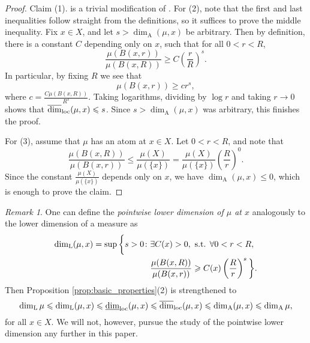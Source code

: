 \documentclass{PRM}
\newcommand{\updim}{\overline{\dim}}
\newcommand{\lowdim}{\underline{\dim}}
\newcommand{\adim}{\dim_{\mathrm{A}}}
\theoremstyle{plain}
\theoremstyle{definition}
\theoremstyle{remark}
\newtheorem{huom}[thm]{Remark}
\begin{document}
\begin{proof}
    Claim (1). is a trivial modification of \cite[Lemma 4.1.1]{F}. For (2), note that the first and last inequalities follow straight from the definitions, so it suffices to prove the middle inequality. Fix $x\in X$, and let $s> \dim_{\mathrm{A}}(\mu,x)$ be arbitrary. Then by definition, there is a constant $C$ depending only on $x$, such that for all $0<r<R$,
    \begin{equation*}
        \frac{\mu(B(x,r))}{\mu(B(x,R))}\geq C\left(\frac{r}{R}\right)^s.
    \end{equation*}
    In particular, by fixing $R$ we see that
    \begin{equation*}
        \mu(B(x,r))\geq c r^s,
    \end{equation*}
    where $c=\frac{C\mu(B(x,R))}{R^s}$. Taking logarithms, dividing by $\log r$ and taking $r\to 0$ shows that $\updim_{\textnormal{loc}}(\mu,x)\leq s$. Since $s>\dim_{\mathrm{A}}(\mu,x)$ was arbitrary, this finishes the proof.

    For (3), assume that $\mu$ has an atom at $x\in X$. Let $0<r<R$, and note that
    \begin{equation*}
        \frac{\mu(B(x,R))}{\mu(B(x,r))}\leq \frac{\mu(X)}{\mu(\{x\})}=\frac{\mu(X)}{\mu(\{x\})}\left(\frac{R}{r}\right)^0.
    \end{equation*}
    Since the constant $\frac{\mu(X)}{\mu(\{x\})}$ depends only on $x$, we have $\dim_{\mathrm{A}}(\mu,x)\leq 0$, which is enough to prove the claim.
\end{proof}

\begin{huom}
One can define the \emph{pointwise lower dimension of $\mu$ at $x$} analogously to the lower dimension of a measure as
\begin{align*}
    \dim_{\mathrm{L}}(\mu,x)=\sup\bigg\{s>0\colon &\exists C(x)>0,\textnormal{ s.t. }\forall0<r<R,\\
    &\frac{\mu(B(x,R))}{\mu(B(x,r))}\geq C(x)\left(\frac{R}{r}\right)^s\bigg\}.
\end{align*}
Then Proposition \ref{prop:basic_properties}(2) is strengthened to 
\begin{equation*}
    \dim_{\mathrm{L}}\mu\leq\dim_{\mathrm{L}}(\mu,x)\leq\lowdim_{\textnormal{loc}}(\mu,x)\leq\updim_{\textnormal{loc}}(\mu,x)\leq \dim_{\mathrm{A}}(\mu,x)\leq\adim\mu,
\end{equation*}
for all $x\in X$. We will not, however, pursue the study of the pointwise lower dimension any further in this paper.
\end{huom}
\end{document}
